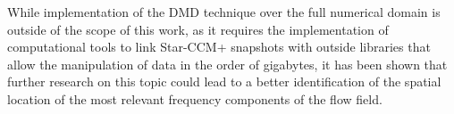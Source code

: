 While implementation of the DMD technique over the full numerical domain is outside of the scope of this work, as it requires the implementation of computational tools to link Star-CCM+ snapshots with outside libraries that allow the manipulation of data in the order of gigabytes, it has been shown that further research on this topic could lead to a better identification of the spatial location of the most relevant frequency components of the flow field.




